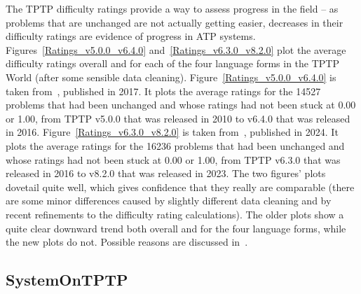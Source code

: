 \documentclass[runningheads]{llncs}
\begin{document}
The TPTP difficulty ratings provide a way to assess progress in the field -- as problems that 
are unchanged are not actually getting easier, decreases in their difficulty ratings are evidence 
of progress in ATP systems.
Figures~\ref{Ratings_v5.0.0_v6.4.0} and~\ref{Ratings_v6.3.0_v8.2.0} plot the average difficulty
ratings overall and for each of the four language forms in the TPTP World (after some sensible
data cleaning).
Figure~\ref{Ratings_v5.0.0_v6.4.0} is taken from~\cite{Sut17}, published in 2017.
It plots the average ratings for the 14527 problems that had been unchanged and whose ratings 
had not been stuck at 0.00 or 1.00, from TPTP v5.0.0 that was released in 2010 to v6.4.0 that was
released in 2016. 
Figure~\ref{Ratings_v6.3.0_v8.2.0} is taken from~\cite{SK+24}, published in 2024.
It plots the average ratings for the 16236 problems that had been unchanged and whose ratings 
had not been stuck at 0.00 or 1.00, from TPTP v6.3.0 that was released in 2016 to v8.2.0 that was
released in 2023. 
The two figures’ plots dovetail quite well, which gives confidence that they really are 
comparable (there are some minor differences caused by slightly different data cleaning 
and by recent refinements to the difficulty rating calculations). 
The older plots show a quite clear downward trend both overall and for the four language forms, 
while the new plots do not. 
Possible reasons are discussed in~\cite{SK+24}.


\subsection{SystemOnTPTP}
\label{SystemOnTPTP}
\end{document}
